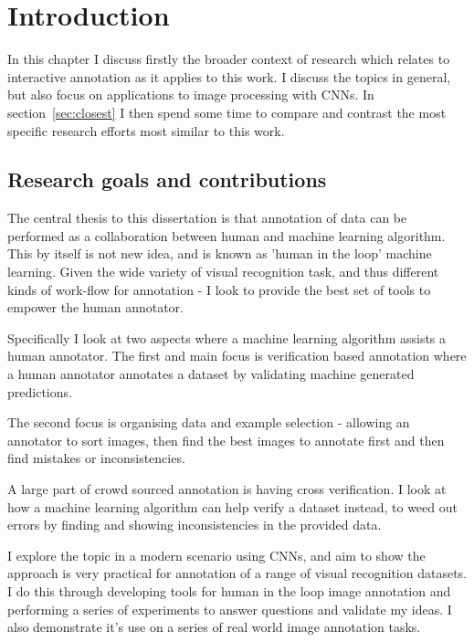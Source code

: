 


\chapter{Introduction}

In this chapter I discuss firstly the broader context of research which relates to interactive annotation as it applies to this work. I discuss the topics in general, but also focus on applications to image processing with \gls{CNN}s. In section~\ref{sec:closest} I then spend some time to compare and contrast the most specific research efforts most similar to this work.

\section{Research goals and contributions}

The central thesis to this dissertation is that annotation of data can be performed as a collaboration between human and machine learning algorithm. This by itself is not new idea, and is known as 'human in the loop' machine learning. Given the wide variety of visual recognition task, and thus different kinds of work-flow for annotation - I look to provide the best set of tools to empower the human annotator.

Specifically I look at two aspects where a machine learning algorithm assists a human annotator. The first and main focus is verification based annotation where a human annotator annotates a dataset by validating machine generated predictions.

The second focus is organising data and example selection - allowing an annotator to sort images, then find the best images to annotate first and then find mistakes or inconsistencies. 

A large part of crowd sourced annotation is having cross verification. I look at how a machine learning algorithm can help verify a dataset instead, to weed out errors by finding and showing inconsistencies in the provided data.

I explore the topic in a modern scenario using \gls{CNN}s, and aim to show the approach is very practical for annotation of a range of visual recognition datasets. I do this through developing tools for human in the loop image annotation and performing a series of experiments to answer questions and validate my ideas. I also demonstrate it's use on a series of real world image annotation tasks.


